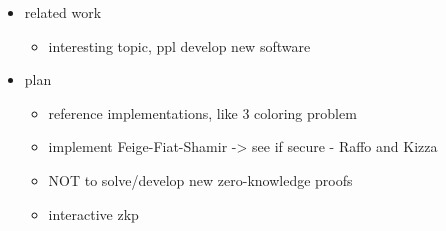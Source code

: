 \documentclass[a4paper,parskip=half]{scrartcl}
\begin{document}
\begin{itemize}
\item related work
	\begin{itemize}
	\item interesting topic, ppl develop new software
	\end{itemize}
\item plan
	\begin{itemize}
	\item reference implementations, like 3 coloring problem
	\item implement Feige-Fiat-Shamir \cite{feige1988zero} -> see if secure - Raffo and Kizza \cite{raffo2002digital, kizza2010feige}
	\item NOT to solve/develop new zero-knowledge proofs
	\item interactive zkp
	\end{itemize}
\end{itemize}



\end{document}
